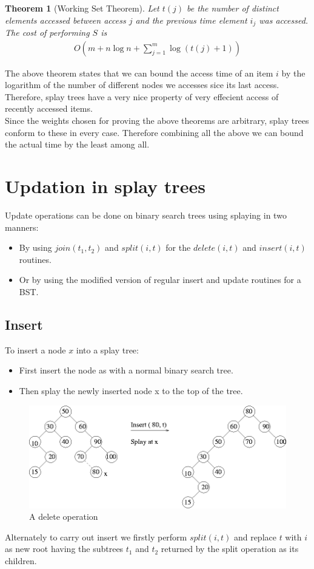 \documentclass{article}
\newtheorem{thm}{Theorem}
\begin{document}
\begin{thm}[Working Set Theorem]
\label{thm:work}
Let $t(j)$ be the number of distinct elements accessed between access $j$ and the previous time element $i_j$ was accessed. The cost of performing $S$ is 
\begin{align}
O(m+ n\log n + \sum_{j=1}^m \log(t(j)+1))
\end{align}
\end{thm}
The above theorem states that we can bound the access time of an item $i$ by the logarithm of the number of different nodes we accesses sice its last access. Therefore, splay trees have a very nice property of very effecient access of recently accessed items.\\
Since the weights chosen for proving the above theorems are arbitrary, splay trees conform to these in every case. Therefore combining all the above we can bound the actual time by the least among all.
\section{Updation in splay trees}
Update operations can be done on binary search trees using splaying in two manners:
\begin{itemize}
\item By using $join(t_1,t_2)$ and $split(i,t)$ for the $delete(i,t)$ and $insert(i,t)$ routines.
\item Or by using the modified version of regular insert and update routines for a BST.
\end{itemize}
\subsection{Insert}
To insert a node $x$ into a splay tree:
\begin{itemize}
\item First insert the node as with a normal binary search tree.
\item Then splay the newly inserted node x to the top of the tree.
\end{itemize}
\begin{figure}[!htpb]
	\label{fig:splay2}
	\begin{center}
		\includegraphics[width=0.6\columnwidth,height=0.5\columnwidth,keepaspectratio]{img200.gif}
	\end{center}
	\caption{A delete operation}
\end{figure}
Alternately to carry out insert we firstly perform $split(i,t)$ and replace $t$ with $i$ as new root having the subtrees $t_1$ and $t_2$ returned by the split operation as its children.
\end{document}
